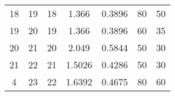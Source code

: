 \begin{table}
\begin{adjustbox}{width=1.2\textwidth,center=\textwidth}
\begin{tabular}{ccccccc}
18                                                        & 19                                                          & 18                                                  & 1.366                                                                      & 0.3896                                                                    & 80                                                                          & 50                                                                               \\
19                                                        & 20                                                          & 19                                                  & 1.366                                                                      & 0.3896                                                                    & 60                                                                          & 35                                                                               \\
20                                                        & 21                                                          & 20                                                  & 2.049                                                                      & 0.5844                                                                    & 50                                                                          & 30                                                                               \\
21                                                        & 22                                                          & 21                                                  & 1.5026                                                                     & 0.4286                                                                    & 50                                                                          & 30                                                                               \\
4                                                         & 23                                                          & 22                                                  & 1.6392                                                                     & 0.4675                                                                    & 80                                                                          & 60                                                                               \\

\end{tabular}
\end{adjustbox}
\end{table}
